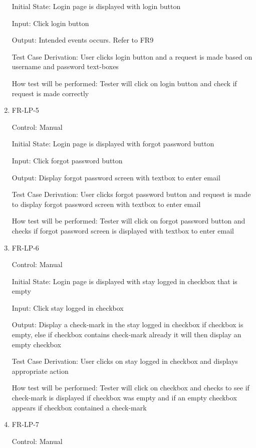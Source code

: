 \documentclass[12pt, titlepage]{article}
\begin{document}
\begin{enumerate}
	Initial State: Login page is displayed with login button
	
	Input: Click login button
	
	Output: Intended events occurs. Refer to FR9
	
	Test Case Derivation: User clicks login button and a request is made based on username and password text-boxes
	
	How test will be performed: Tester will click on login button and check if request is made correctly
	
	\item{FR-LP-5\\}
	
	Control: Manual
	
	Initial State: Login page is displayed with forgot password button
	
	Input: Click forgot password button
	
	Output: Display forgot password screen with textbox to enter email
	
	Test Case Derivation: User clicks forgot password button and request is made to display forgot password screen with textbox to enter email
	
	How test will be performed: Tester will click on forgot password button and checks if forgot password screen is displayed with textbox to enter email
	
	\item{FR-LP-6\\}
	
	Control: Manual
	
	Initial State: Login page is displayed with stay logged in checkbox that is empty
	
	Input: Click stay logged in checkbox
	
	Output: Display a check-mark in the stay logged in checkbox if checkbox is empty, else if checkbox contains check-mark already it will then display an empty checkbox
	
	Test Case Derivation: User clicks on stay logged in checkbox and displays appropriate action
	
	How test will be performed: Tester will click on checkbox and checks to see if check-mark is displayed if checkbox was empty and if an empty checkbox appears if checkbox contained a check-mark
	
	\item{FR-LP-7\\}
	
	Control: Manual
	

\end{enumerate}
\end{document}
